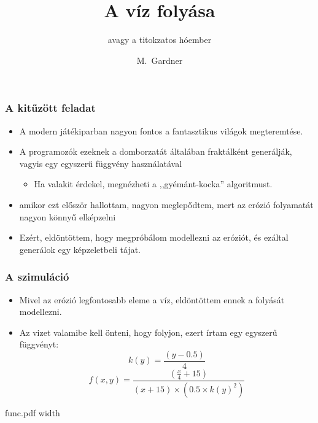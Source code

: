 \documentclass{beamer}
\title[A víz folyása]{A víz folyása}
\subtitle{avagy a titokzatos hóember}
\author[Gardner]{M.~Gardner}
\begin{document}
	\frame{\titlepage}
	\begin{frame}
		\frametitle{A kitűzött feladat}
		\begin{itemize}
			\item A modern játékiparban nagyon fontos a fantasztikus világok megteremtése.
			
			\item A programozók ezeknek a domborzatát általában fraktálként generálják, vagyis egy egyszerű függvény használatával
			
			\begin{itemize}
				\item Ha valakit érdekel, megnézheti a ,,gyémánt-kocka'' algoritmust.
			\end{itemize}
			
			\item amikor ezt először hallottam, nagyon meglepődtem, mert az erózió folyamatát nagyon könnyű elképzelni
			
			\item Ezért, eldöntöttem, hogy megpróbálom modellezni az eróziót, és ezáltal generálok egy képzeletbeli tájat.
		\end{itemize}
	\end{frame}
	\begin{frame}
		\frametitle{A szimuláció}
		\begin{itemize}
			\item Mivel az erózió legfontosabb eleme a víz, eldöntöttem ennek a folyását modellezni.
			
			\item Az vizet valamibe kell önteni, hogy folyjon, ezert írtam egy egyszerű függvényt:
			\begin{equation}
				k(y)=\frac{(y-0.5)}{4}
			\end{equation}
			\begin{equation}
				f(x,y)=\frac{(\frac{x}{4}+15)}{(x+15)\times (0.5\times {k(y)}^{2})}
			\end{equation}
		\end{itemize}
	\end{frame}
	\begin{frame}
		\XeTeXpdffile func.pdf width \textwidth
	\end{frame}
\end{document}
